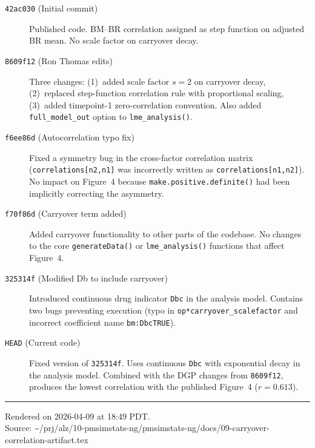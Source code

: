 \documentclass[11pt]{article}
\begin{document}
\begin{description}
\item[\texttt{42ac030} (Initial commit)]
  Published code. BM--BR correlation assigned as step
  function on adjusted BR mean. No scale factor on
  carryover decay.

\item[\texttt{8609f12} (Ron Thomas edits)]
  Three changes: (1)~added scale factor $s = 2$ on
  carryover decay, (2)~replaced step-function correlation
  rule with proportional scaling, (3)~added timepoint-1
  zero-correlation convention. Also added
  \texttt{full\_model\_out} option to
  \texttt{lme\_analysis()}.

\item[\texttt{f6ee86d} (Autocorrelation typo fix)]
  Fixed a symmetry bug in the cross-factor correlation
  matrix (\texttt{correlations[n2,n1]} was incorrectly
  written as \texttt{correlations[n1,n2]}). No impact on
  Figure~4 because \texttt{make.positive.definite()} had
  been implicitly correcting the asymmetry.

\item[\texttt{f70f86d} (Carryover term added)]
  Added carryover functionality to other parts of the
  codebase. No changes to the core \texttt{generateData()}
  or \texttt{lme\_analysis()} functions that affect
  Figure~4.

\item[\texttt{325314f} (Modified Db to include carryover)]
  Introduced continuous drug indicator \texttt{Dbc} in the
  analysis model. Contains two bugs preventing execution
  (typo in \texttt{op*carryover\_scalefactor} and incorrect
  coefficient name \texttt{bm:DbcTRUE}).

\item[\texttt{HEAD} (Current code)]
  Fixed version of \texttt{325314f}. Uses continuous
  \texttt{Dbc} with exponential decay in the analysis
  model. Combined with the DGP changes from
  \texttt{8609f12}, produces the lowest correlation with
  the published Figure~4 ($r = 0.613$).
\end{description}

\vfill
\noindent\rule{\textwidth}{0.4pt}
{\footnotesize
Rendered on 2026-04-09 at 18:49 PDT.\\
Source: \textasciitilde/prj/alz/10-pmsimstats-ng/pmsimstats-ng/docs/09-carryover-correlation-artifact.tex}
\end{document}
